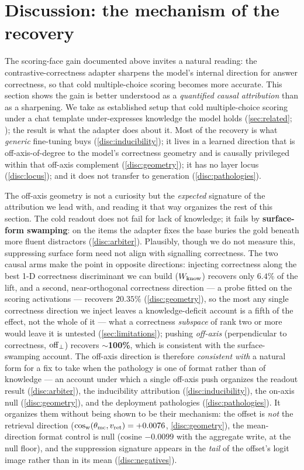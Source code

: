 \section{Discussion: the mechanism of the recovery}\label{sec:discussion}

The scoring-face gain documented above invites a natural reading: the
contrastive-correctness adapter sharpens the model's internal direction for answer
correctness, so that cold multiple-choice scoring becomes more accurate. This
section shows the gain is better understood as a \emph{quantified causal
attribution} than as a sharpening. We take as established setup that cold
multiple-choice scoring under a chat template under-expresses knowledge the model
holds (\cref{sec:related}; \citealp{ConfidenceManifold,InsideOut,KAPPA}); the
result is what the adapter does about it. Most of the recovery is what
\emph{generic} fine-tuning buys (\cref{disc:inducibility}); it lives in a learned
direction that is off-axis-of-degree to the model's correctness geometry and is
causally privileged within that off-axis complement (\cref{disc:geometry}); it has
no layer locus (\cref{disc:locus}); and it does not transfer to generation
(\cref{disc:pathologies}).

The off-axis geometry is not a curiosity but the \emph{expected} signature of the
attribution we lead with, and reading it that way organizes the rest of this
section. The cold readout does not fail for lack of knowledge; it fails by
\textbf{surface-form swamping}: on the items the adapter fixes the base buries the
gold beneath more fluent distractors (\cref{disc:arbiter}). Plausibly, though we do
not measure this, suppressing surface form need not align with signalling
correctness. The two causal arms make the point in opposite directions: injecting
correctness along the best 1-D correctness discriminant we can build ($W_{\mathrm{know}}$)
recovers only $\mathbf{6.4\%}$ of the lift, and a second, near-orthogonal
correctness direction --- a probe fitted on the scoring activations --- recovers
$\mathbf{20.35\%}$ (\cref{disc:geometry}), so the most any single correctness
direction we inject leaves a knowledge-deficit account is a fifth of the effect, not
the whole of it --- what a correctness \emph{subspace} of rank two or more would
leave it is untested (\cref{sec:limitations}); pushing \emph{off-axis}
(perpendicular to correctness, $\mathrm{off}_{\perp}$) recovers
${\sim}$\textbf{100\%}, which is consistent with the surface-swamping account. The
off-axis direction is therefore \emph{consistent with} a natural form for a
fix to take when the pathology is one of format rather than of knowledge --- an
account under which a single off-axis push organizes the readout result
(\cref{disc:arbiter}), the inducibility attribution (\cref{disc:inducibility}), the
on-axis null (\cref{disc:geometry}), and the deployment pathologies
(\cref{disc:pathologies}). It organizes them without being shown to be their
mechanism: the offset is \emph{not} the retrieval direction
($\cos_{\mathrm{w}}(\theta_{\mathrm{mc}},v_{\mathrm{ret}}) = +0.0076$, \cref{disc:geometry}), the mean-direction
format control is null (cosine $-0.0099$ with the aggregate write, at the null
floor), and the suppression signature appears in the \emph{tail} of the offset's
logit image rather than in its mean (\cref{disc:negatives}).

